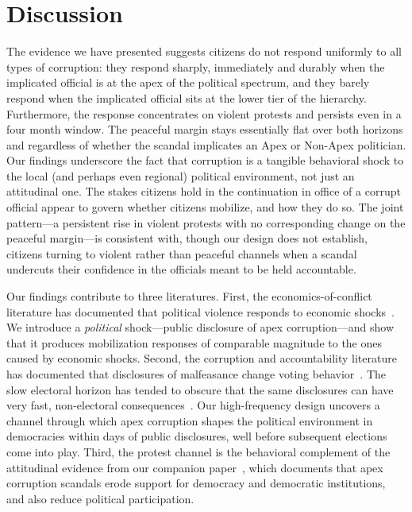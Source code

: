 \documentclass[11pt]{article}
\begin{document}
\section{Discussion}
The evidence we have presented suggests citizens do not respond uniformly to all types of corruption: they respond sharply, immediately and durably when the implicated official is at the apex of the political spectrum, and they barely respond when the implicated official sits at the lower tier of the hierarchy. Furthermore, the response concentrates on violent protests and persists even in a four month window. The peaceful margin stays essentially flat over both horizons and regardless of whether the scandal implicates an Apex or Non-Apex politician. Our findings underscore the fact that corruption is a tangible behavioral shock to the local (and perhaps even regional) political environment, not just an attitudinal one. The stakes citizens hold in the continuation in office of a corrupt official appear to govern whether citizens mobilize, and how they do so. The joint pattern---a persistent rise in violent protests with no corresponding change on the peaceful margin---is consistent with, though our design does not establish, citizens turning to violent rather than peaceful channels when a scandal undercuts their confidence in the officials meant to be held accountable.

Our findings contribute to three literatures. First, the economics-of-conflict literature has documented that political violence responds to economic shocks~\citep{koenig2017networks,mcguirk2020economic,dube2013commodity,besley2011logic,berman2011hearts,rohner2026aidingpeace}. We introduce a \textit{political} shock---public disclosure of apex corruption---and show that it produces mobilization responses of comparable magnitude to the ones caused by economic shocks. Second, the corruption and accountability literature has documented that disclosures of malfeasance change voting behavior~\citep{ferraz2008exposing,ferraz2011electoral,FerrazFinanAccount,ferraz2018audits,horacio2019infonetwork}. The slow electoral horizon has tended to obscure that the same disclosures can have very fast, non-electoral consequences~\citep{madestam2013protests,bursztyn2021persistent}. Our high-frequency design uncovers a channel through which apex corruption shapes the political environment in democracies within days of public disclosures, well before subsequent elections come into play. Third, the protest channel is the behavioral complement of the attitudinal evidence from our companion paper~\citep{ApexCorruption}, which documents that apex corruption scandals erode support for democracy and democratic institutions, and also reduce political participation.
\end{document}
